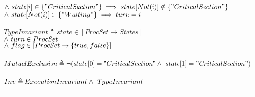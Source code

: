 \documentclass[fleqn]{tukseminar}
\begin{document}
			\hspace*{0.8cm}$\land \   state[i] \in \{"CriticalSection"\} \implies state[Not(i)] \notin \{"CriticalSection"\}$\\
			\hspace*{0.8cm}$\land \  state[Not(i)] \in \{"Waiting"\} \implies turn = i$\\\\
			$ TypeInvariant \triangleq state \in [ProcSet \rightarrow States]$ \\
			\hspace*{0.8cm}$\land \  turn \in ProcSet$\\
			\hspace*{0.8cm}$\land \  flag \in [ProcSet \rightarrow \{true, false\}]$\\\\
			$MutualExclusion \triangleq \lnot(state[0] = "CriticalSection" \land \  state[1] = "CriticalSection")$\\\\
			$Inv \triangleq ExecutionInvariant \land \  TypeInvariant$\\
			
			\hrule
			
\end{document}
